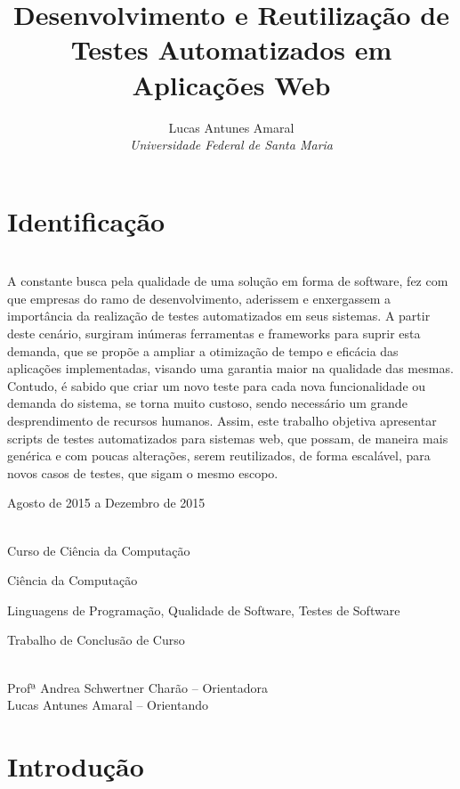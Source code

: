 \documentclass[12pt]{article}
\title{Desenvolvimento e Reutilização de Testes Automatizados em Aplicações Web}
\author{Lucas Antunes Amaral \\ \emph{Universidade Federal de Santa Maria}}
\begin{document}
	\maketitle
	
	\section{Identificação}
	
	\begin{description} \itemsep 0pt
		\item[Resumo:] ~\\
		A constante busca pela qualidade de uma solução em forma de software, fez com que empresas do ramo de desenvolvimento,
		aderissem e enxergassem a importância da realização de testes automatizados em seus sistemas. A partir deste cenário,
		surgiram inúmeras ferramentas e frameworks para suprir esta demanda, que se propõe  a ampliar a otimização de tempo e
		eficácia das aplicações implementadas, visando uma garantia maior na qualidade das mesmas. Contudo, é sabido que criar
		um novo teste para cada nova funcionalidade ou demanda do sistema, se torna muito custoso, sendo necessário um grande
		desprendimento de recursos humanos. Assim, este trabalho objetiva apresentar scripts de testes automatizados para
		sistemas web, que possam, de maneira mais genérica e com poucas alterações, serem reutilizados, de forma escalável,
		para novos casos de testes, que sigam o mesmo escopo.
		\item[Período de execução:] Agosto de 2015 a Dezembro de 2015
		\item[Unidades participantes:] ~\\ Curso de Ciência da Computação
		\item[Área de conhecimento:] Ciência da Computação
		\item[Linha de Pesquisa:] Linguagens de Programação, Qualidade de Software, Testes de Software
		\item[Tipo de projeto:] Trabalho de Conclusão de Curso
		\item[Participantes:] ~\\ Profª Andrea Schwertner Charão -- Orientadora \\ Lucas Antunes Amaral -- Orientando
	\end{description}
	
	\section{Introdução}
	
\end{document}
